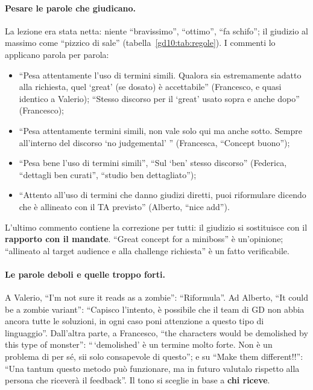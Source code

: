 \paragraph{Pesare le parole che giudicano.} La lezione era stata netta: niente
``bravissimo'', ``ottimo'', ``fa schifo''; il giudizio al massimo come
``pizzico di sale'' (tabella~\ref{gd10:tab:regole}). I commenti lo applicano
parola per parola:
\begin{itemize}
  \item ``Pesa attentamente l'uso di termini simili. Qualora sia estremamente
        adatto alla richiesta, quel `great' (se dosato) è accettabile''
        (Francesco, e quasi identico a Valerio); ``Stesso discorso per il
        `great' usato sopra e anche dopo'' (Francesco);
  \item ``Pesa attentamente termini simili, non vale solo qui ma anche sotto.
        Sempre all'interno del discorso `no judgemental' '' (Francesca,
        ``Concept buono'');
  \item ``Pesa bene l'uso di termini simili'', ``Sul `ben' stesso discorso''
        (Federica, ``dettagli ben curati'', ``studio ben dettagliato'');
  \item ``Attento all'uso di termini che danno giudizi diretti, puoi
        riformulare dicendo che è allineato con il TA previsto'' (Alberto,
        ``nice add'').
\end{itemize}
L'ultimo commento contiene la correzione per tutti: il giudizio si sostituisce
con il \textbf{rapporto con il mandate}. ``Great concept for a miniboss'' è
un'opinione; ``allineato al target audience e alla challenge richiesta'' è un
fatto verificabile.

\paragraph{Le parole deboli e quelle troppo forti.} A Valerio, ``I'm not sure
it reads as a zombie'': ``Riformula''. Ad Alberto, ``It could be a zombie
variant'': ``Capisco l'intento, è possibile che il team di GD non abbia ancora
tutte le soluzioni, in ogni caso poni attenzione a questo tipo di
linguaggio''. Dall'altra parte, a Francesco, ``the characters would be
demolished by this type of monster'': ``\,`demolished' è un termine molto
forte. Non è un problema di per sé, sii solo consapevole di questo''; e su
``Make them different!!'': ``Una tantum questo metodo può funzionare, ma in
futuro valutalo rispetto alla persona che riceverà il feedback''. Il tono si
sceglie in base a \textbf{chi riceve}.


